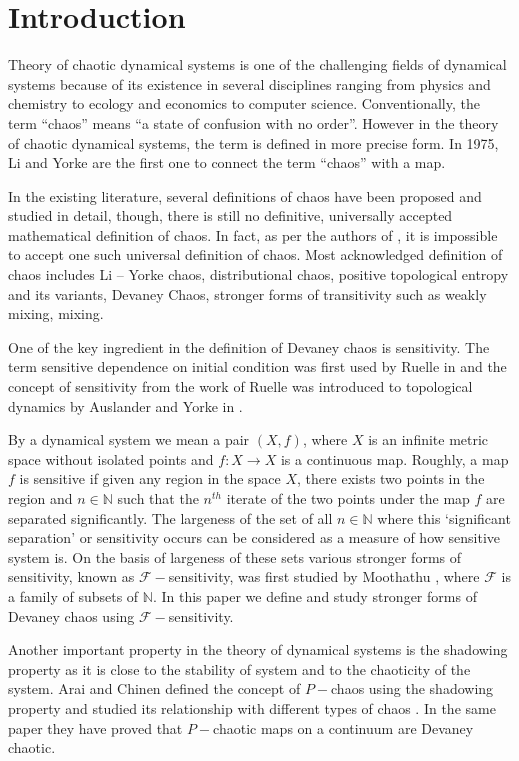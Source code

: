\documentclass{amsart}[12pt, papera4]
\theoremstyle{definition}
\theoremstyle{remark}
\numberwithin{equation}{section}
\def\N{{\mathbb N}}
\def\F{{\mathscr{F}}}
\begin{document}
	\section{Introduction}

\smallskip
\noindent Theory of chaotic dynamical systems is one of the challenging fields of dynamical systems because of its existence  in several disciplines ranging from physics and chemistry to ecology and economics to computer science. 
Conventionally, the term “chaos” means “a state of confusion with no order”. However in the theory of chaotic dynamical systems, the term is defined in more precise form. In 1975, Li and Yorke \cite{ly1} are the first one to connect the term “chaos” with a map. 

\medskip
\noindent In the existing literature, several definitions of chaos have been proposed and studied in detail, though, there is still no definitive, universally accepted mathematical definition of chaos. In fact, as per the authors of \cite{ly}, it is impossible to accept one such universal definition of chaos.  Most acknowledged definition of chaos includes Li – Yorke chaos, distributional chaos, positive topological entropy and its variants, Devaney Chaos, stronger forms of transitivity such as weakly mixing, mixing. 

\medskip
\noindent One of the key ingredient in the definition of Devaney chaos is sensitivity. The term sensitive dependence on initial condition was first used by Ruelle in \cite{RD} and the concept of sensitivity from the work of Ruelle was introduced to topological dynamics by Auslander and Yorke in \cite{AY}. 

\medskip
\noindent By a dynamical system we mean a pair $(X,f)$, where $X$ is an infinite metric space without isolated points and $f: X\longrightarrow X$ is a continuous map. Roughly, a map $f$ is sensitive if given any region in the space $X$, there exists two points in the region and $n \in \N$ such that the $n^{th}$ iterate of the two points under the map $f$ are separated significantly. The largeness of the set of all $n \in \N$ where this \textquoteleft significant separation' or sensitivity occurs can be considered as a measure of how sensitive system is. On the basis of largeness of these sets various stronger forms of sensitivity, known as $\F-$sensitivity, was first studied by Moothathu \cite{TKS}, where $\F$ is a family of subsets of $\N$. In this paper we define and study stronger forms of Devaney chaos using $\F-$sensitivity.

\medskip
\noindent Another important property in the theory of dynamical systems is the shadowing property as it is close to the stability of system and to the chaoticity of the system. Arai and Chinen defined the concept of $P-$chaos using the shadowing property and studied its relationship with different types of chaos \cite{Arai}. In the same paper they have proved that $P-$chaotic maps on a continuum are Devaney chaotic. 
\end{document}
